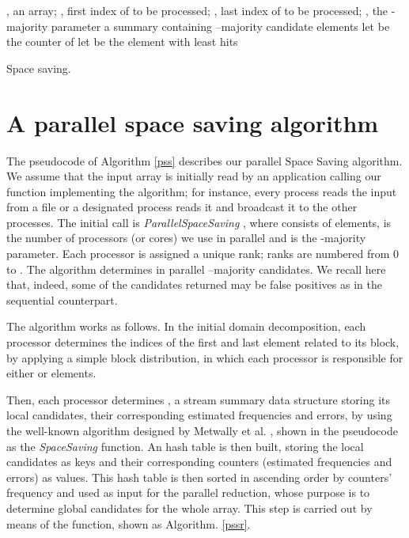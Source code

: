 \documentclass[final,3p,times]{elsarticle}
\begin{document}
\begin{algorithm}
\begin{algorithmic}[1]
\Require , an array; , first index of  to be processed; , last index of  to be processed; , the -majority parameter
\Ensure a summary containing --majority candidate elements
\State 
{}
		\State let  be the counter of  
		\State 
	\Else
		\State let  be the element with least hits
		\State  
		\State 
		\State 
	\EndIf
\EndFor
\State \Return 
\EndProcedure
\caption{Space saving.}
\label{ss}
\end{algorithmic}
\end{algorithm}


\section{A parallel space saving algorithm}

\label{pss-algorithm}

The pseudocode of Algorithm \ref{pss} describes our parallel Space Saving algorithm. We assume that the input array  is initially read by an application calling our function implementing the algorithm; for instance, every process reads the input from a file or a designated process reads it and broadcast it to the other processes. The initial call is \textit{ParallelSpaceSaving} , where  consists of  elements,  is the number of processors (or cores) we use in parallel and  is the -majority parameter. Each processor is assigned a unique rank; ranks are numbered from 0 to . The algorithm determines in parallel --majority candidates. We recall here that, indeed, some of the candidates returned may be false positives as in the sequential counterpart.

The algorithm works as follows. In the initial domain decomposition, each processor determines the indices of the first and last
element related to its block, by applying a simple block distribution, in which each processor is responsible for either  or  elements.

Then, each processor determines , a stream summary data structure storing its local candidates, their corresponding estimated frequencies and errors, by using the well-known  algorithm designed by Metwally et al. \cite{Metwally2006}, shown in the pseudocode as the \textit{SpaceSaving} function. An hash table  is then built, storing the local candidates as keys and their corresponding counters (estimated frequencies and errors) as values. This hash table is then sorted in ascending order by counters' frequency and used as input for the parallel reduction, whose purpose is to determine global candidates for the whole array.
This step is carried out by means of the  function, shown as Algorithm. \ref{pssr}.
\end{document}
